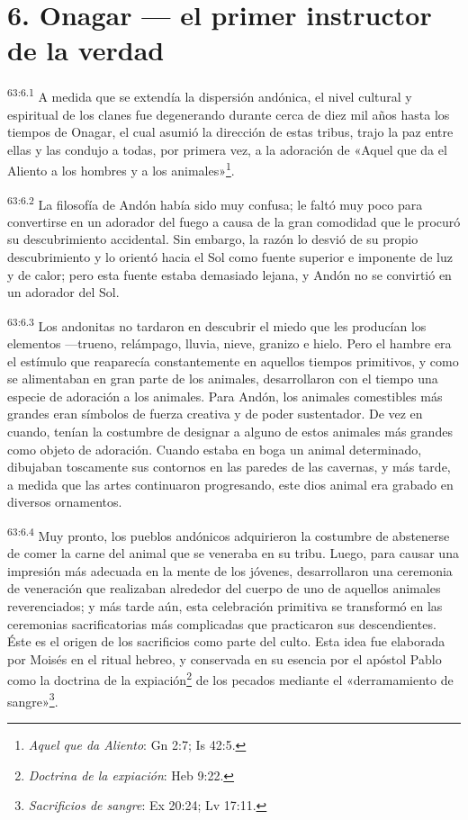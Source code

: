 \section*{6. Onagar --- el primer instructor de la verdad}
\par
\textsuperscript{63:6.1} A medida que se extendía la dispersión andónica, el nivel cultural y espiritual de los clanes fue degenerando durante cerca de diez mil años hasta los tiempos de Onagar, el cual asumió la dirección de estas tribus, trajo la paz entre ellas y las condujo a todas, por primera vez, a la adoración de «Aquel que da el Aliento a los hombres y a los animales»\footnote{\textit{Aquel que da Aliento}: Gn 2:7; Is 42:5.}.

\par
\textsuperscript{63:6.2} La filosofía de Andón había sido muy confusa; le faltó muy poco para convertirse en un adorador del fuego a causa de la gran comodidad que le procuró su descubrimiento accidental. Sin embargo, la razón lo desvió de su propio descubrimiento y lo orientó hacia el Sol como fuente superior e imponente de luz y de calor; pero esta fuente estaba demasiado lejana, y Andón no se convirtió en un adorador del Sol.

\par
\textsuperscript{63:6.3} Los andonitas no tardaron en descubrir el miedo que les producían los elementos ---trueno, relámpago, lluvia, nieve, granizo e hielo. Pero el hambre era el estímulo que reaparecía constantemente en aquellos tiempos primitivos, y como se alimentaban en gran parte de los animales, desarrollaron con el tiempo una especie de adoración a los animales. Para Andón, los animales comestibles más grandes eran símbolos de fuerza creativa y de poder sustentador. De vez en cuando, tenían la costumbre de designar a alguno de estos animales más grandes como objeto de adoración. Cuando estaba en boga un animal determinado, dibujaban toscamente sus contornos en las paredes de las cavernas, y más tarde, a medida que las artes continuaron progresando, este dios animal era grabado en diversos ornamentos.

\par
\textsuperscript{63:6.4} Muy pronto, los pueblos andónicos adquirieron la costumbre de abstenerse de comer la carne del animal que se veneraba en su tribu. Luego, para causar una impresión más adecuada en la mente de los jóvenes, desarrollaron una ceremonia de veneración que realizaban alrededor del cuerpo de uno de aquellos animales reverenciados; y más tarde aún, esta celebración primitiva se transformó en las ceremonias sacrificatorias más complicadas que practicaron sus descendientes. Éste es el origen de los sacrificios como parte del culto. Esta idea fue elaborada por Moisés en el ritual hebreo, y conservada en su esencia por el apóstol Pablo como la doctrina de la expiación\footnote{\textit{Doctrina de la expiación}: Heb 9:22.} de los pecados mediante el «derramamiento de sangre»\footnote{\textit{Sacrificios de sangre}: Ex 20:24; Lv 17:11.}.


